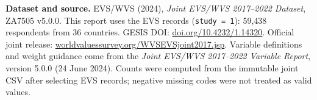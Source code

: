\documentclass[10pt,a4paper]{article}
\begin{document}
\vspace{1pt}
{\fontsize{6.6}{7.7}\selectfont\color{Muted}
\textbf{Dataset and source.} EVS/WVS (2024), \textit{Joint EVS/WVS 2017--2022 Dataset}, ZA7505 v5.0.0. This report uses the EVS records (\texttt{study = 1}): 59,438 respondents from 36 countries. GESIS DOI: \href{https://doi.org/10.4232/1.14320}{doi.org/10.4232/1.14320}. Official joint release: \href{https://www.worldvaluessurvey.org/WVSEVSjoint2017.jsp}{worldvaluessurvey.org/WVSEVSjoint2017.jsp}. Variable definitions and weight guidance come from the \textit{Joint EVS/WVS 2017--2022 Variable Report}, version 5.0.0 (24 June 2024). Counts were computed from the immutable joint CSV after selecting EVS records; negative missing codes were not treated as valid values.
}
\end{document}
